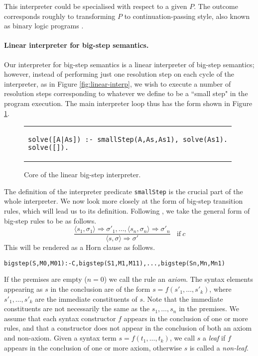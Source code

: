 \documentclass{llncs}
\begin{document}
This interpreter could be specialised with respect to a given $P$.  The outcome corresponds roughly to transforming $P$ to continuation-passing
style, also known as binary logic programs \cite{Demoen}.

\paragraph{Linear interpreter for big-step semantics.} 
Our interpreter for big-step semantics is a linear interpreter of big-step semantics; however,  
instead of performing just one resolution step on each cycle of the interpreter,
as in Figure \ref{fig:linear-interp}, we wish to execute a number of resolution steps corresponding to whatever we define to be a ``small step" in the 
program execution.  The main interpreter loop thus has the form shown in Figure \ref{fig:linear-bigstep}.
\begin{figure}
\begin{tabular}{l}
\begin{lstlisting}
solve([A|As]) :- smallStep(A,As,As1), solve(As1).
solve([]).
\end{lstlisting}
\end{tabular}
\caption{Core of the linear big-step interpreter.}\label{fig:linear-bigstep}
\end{figure}

The definition of the interpreter predicate \texttt{smallStep} is the crucial part of the whole interpreter.
We now look more closely at the form of big-step transition rules, which will lead us to its definition. 
Following \cite{Nielsons}, we take the general form of big-step rules to
be as follows.
\[
\dfrac{\langle s_1, \sigma_1\rangle \Longrightarrow \sigma'_1, \ldots, \langle s_n, \sigma_n\rangle \Longrightarrow \sigma'_n}
{\langle s, \sigma\rangle \Longrightarrow \sigma'} 
~~~~\mathrm{if }~ c
\]
This will be rendered as a Horn clause as follows.
\begin{lstlisting}
bigstep(S,M0,M01):-C,bigstep(S1,M1,M11),...,bigstep(Sn,Mn,Mn1)
\end{lstlisting}
If the premises are empty ($n=0$) we call the rule an \emph{axiom}.  The syntax elements appearing as $s$ in the conclusion 
are of the form $s=f(s'_1,\ldots,s'_k)$, where $s'_1,\ldots,s'_k$ are the immediate constituents of $s$.  Note that the immediate constituents 
are not necessarily the same as the $s_1,\ldots,s_n$ in the premises.  We assume that each syntax constructor $f$ appears in the conclusion
of one or more rules, and that a constructor does not appear in the conclusion of both an axiom and non-axiom. Given a syntax term $s=f(t_1,\ldots,t_k)$,
we call $s$ a \emph{leaf} if $f$ appears in the conclusion of one or more axiom, otherwise $s$ is called a \emph{non-leaf}.
\end{document}
